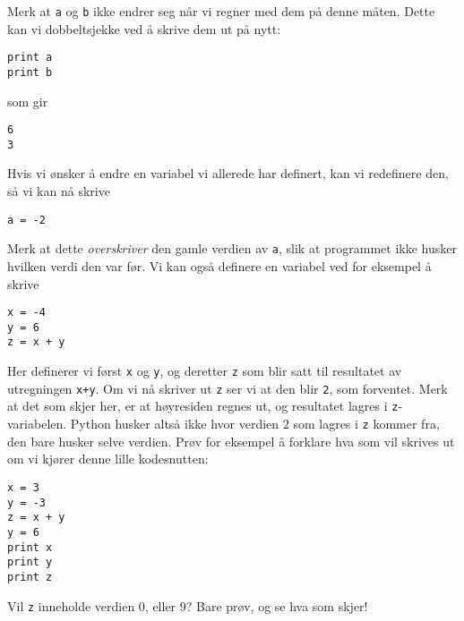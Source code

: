 \documentclass[a4paper, 11pt, notitlepage]{article}
\begin{document}
Merk at \verb+a+ og \verb+b+ ikke endrer seg når vi regner med dem på denne måten. Dette kan vi dobbeltsjekke ved å skrive dem ut på nytt:
\begin{lstlisting}
print a
print b
\end{lstlisting}
\vspace{-0.3cm}
som gir
\begin{lstlisting}
6
3
\end{lstlisting}
\vspace{-0.3cm}
Hvis vi ønsker å endre en variabel vi allerede har definert, kan vi redefinere den, så vi kan nå skrive
\begin{lstlisting}
a = -2
\end{lstlisting}
\vspace{-0.3cm}
Merk at dette \emph{overskriver} den gamle verdien av \verb+a+, slik at programmet ikke husker hvilken verdi den var før. Vi kan også definere en variabel ved for eksempel å skrive
\begin{lstlisting}
x = -4
y = 6
z = x + y
\end{lstlisting}
\vspace{-0.3cm}
Her definerer vi først \verb+x+ og \verb+y+, og deretter \verb+z+ som blir satt til resultatet av utregningen \verb!x+y!. Om vi nå skriver ut \verb+z+ ser vi at den blir \verb+2+, som forventet. Merk at det som skjer her, er at høyresiden regnes ut, og resultatet lagres i \verb+z+-variabelen. Python husker altså ikke hvor verdien $2$ som lagres i \verb+z+ kommer fra, den bare husker selve verdien. Prøv for eksempel å forklare hva som vil skrives ut om vi kjører denne lille kodesnutten:
\begin{lstlisting}
x = 3
y = -3
z = x + y
y = 6
print x 
print y 
print z
\end{lstlisting}
\vspace{-0.3cm}
Vil \verb+z+ inneholde verdien 0, eller 9? Bare prøv, og se hva som skjer!
\end{document}

